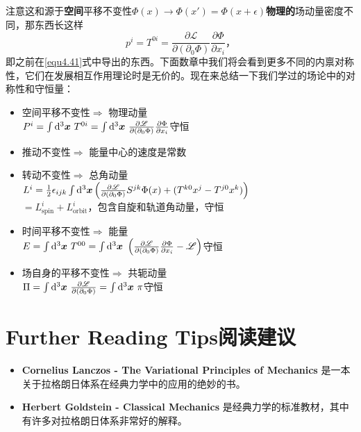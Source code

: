 注意这和源于{\bf 空间}平移不变性$\Phi(x)\rightarrow\Phi(x')=\Phi(x+\epsilon)${\bf 物理的}场动量密度不同，那东西长这样
\[
p^i = T^{0i} = \frac{\partial \mathscr{L}}{\partial (\partial_0 \Phi)} \frac{\partial\Phi}{\partial x_i} \text{，}
\]
即之前在\eqref{equ4.41}式中导出的东西。下面数章中我们将会看到更多不同的内禀对称性，它们在发展相互作用理论时是无价的。现在来总结一下我们学过的场论中的对称性和守恒量：
\begin{itemize}
\item 空间平移不变性$\Rightarrow$ 物理动量\\$P^i = \int\mathrm d^3\bm{x}~T^{0i}=\int\mathrm d^3\bm{x}~ \frac{\partial \mathscr{L}}{\partial (\partial_0 \Phi)} \frac{\partial\Phi}{\partial x_i}$守恒
\item 推动不变性$\Rightarrow$ 能量中心的速度是常数
\item 转动不变性$\Rightarrow$ 总角动量\\$L^i =\frac{1}{2}\epsilon_{ijk} \int \mathrm d^3 \bm{x} \left(\frac{\partial\mathscr L}{\partial (\partial_0 \Phi)}S^{jk}\Phi(x) + (T^{k0} x^j-T^{j0}x^k)\right) $\\$= L_\text{spin}^i + L_\text{orbit}^i $，包含自旋和轨道角动量，守恒
\item 时间平移不变性$\Rightarrow$ 能量\\$E = \int\mathrm d^3\bm{x}~T^{00}=\int\mathrm d^3\bm{x}~\left(\frac{\partial \mathscr{L}}{\partial (\partial_0 \Phi)} \frac{\partial\Phi}{\partial x_i}-\mathscr{L}\right)$守恒
\item 场自身的平移不变性$\Rightarrow$ 共轭动量\\$\Pi = \int\mathrm d^3\bm{x}~\frac{\partial \mathscr{L}}{\partial (\partial_0 \Phi)} = \int\mathrm d^3\bm{x}~\pi$守恒
\end{itemize}

\section*{Further Reading Tips\quad 阅读建议}
\begin{itemize}
\item {\bf Cornelius Lanczos - The Variational Principles of Mechanics}%
%
是一本关于拉格朗日体系在经典力学中的应用的绝妙的书。
\item {\bf Herbert Goldstein - Classical Mechanics}%
%
是经典力学的标准教材，其中有许多对拉格朗日体系非常好的解释。
\end{itemize}

